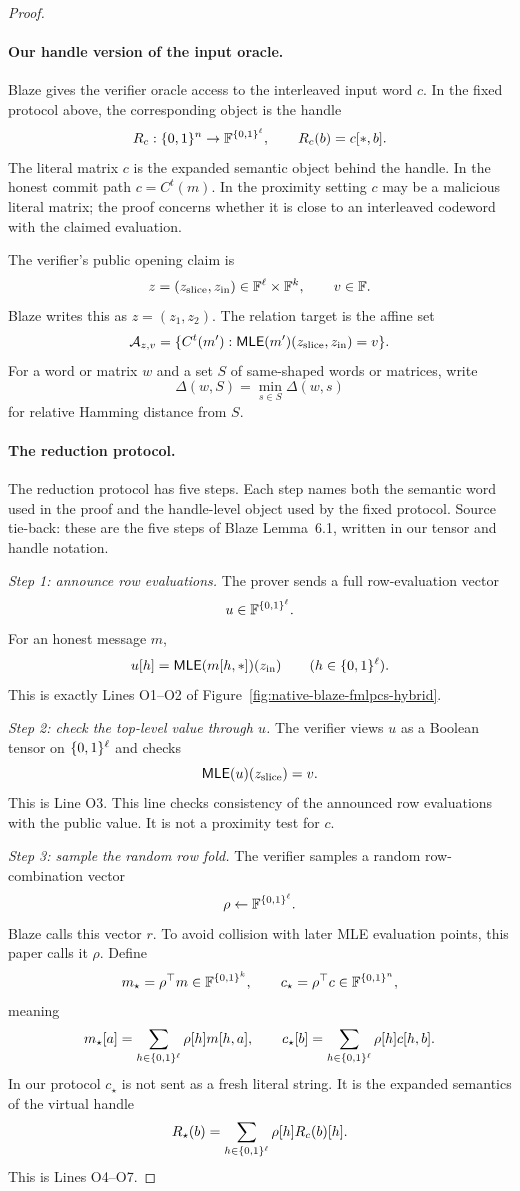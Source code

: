 \begin{proof}
\paragraph{Our handle version of the input oracle.}
Blaze gives the verifier oracle access to the interleaved input word \(c\).  In
the fixed protocol above, the corresponding object is the handle
\[
  R_c:\{0,1\}^n\to\mathbb{F}^{\{0,1\}^\ell},
  \qquad
  R_c(b)=c[\ast,b].
\]
The literal matrix \(c\) is the expanded semantic object behind the handle.  In
the honest commit path \(c=C^t(m)\).  In the proximity setting \(c\) may be a
malicious literal matrix; the proof concerns whether it is close to an
interleaved codeword with the claimed evaluation.

The verifier's public opening claim is
\[
  z=(z_{\mathrm{slice}},z_{\mathrm{in}})
  \in\mathbb{F}^\ell\times\mathbb{F}^k,
  \qquad
  v\in\mathbb{F}.
\]
Blaze writes this as \(z=(z_1,z_2)\).  The relation target is the affine set
\[
  \mathcal A_{z,v}
  =
  \{C^t(m'):\mathsf{MLE}(m')(z_{\mathrm{slice}},z_{\mathrm{in}})=v\}.
\]
For a word or matrix \(w\) and a set \(S\) of same-shaped words or matrices,
write
\[
  \Delta(w,S)=\min_{s\in S}\Delta(w,s)
\]
for relative Hamming distance from \(S\).

\paragraph{The reduction protocol.}
The reduction protocol has five steps.  Each step names both the semantic word
used in the proof and the handle-level object used by the fixed protocol.
Source tie-back: these are the five steps of Blaze Lemma~6.1, written in our
tensor and handle notation.

\emph{Step 1: announce row evaluations.}
The prover sends a full row-evaluation vector
\[
  u\in\mathbb{F}^{\{0,1\}^\ell}.
\]
For an honest message \(m\),
\[
  u[h]=\mathsf{MLE}(m[h,\ast])(z_{\mathrm{in}})
  \qquad(h\in\{0,1\}^\ell).
\]
This is exactly Lines O1--O2 of Figure~\ref{fig:native-blaze-fmlpcs-hybrid}.

\emph{Step 2: check the top-level value through \(u\).}
The verifier views \(u\) as a Boolean tensor on \(\{0,1\}^\ell\) and checks
\[
  \mathsf{MLE}(u)(z_{\mathrm{slice}})
  =
  v.
\]
This is Line O3.  This line checks consistency of the announced row
evaluations with the public value.  It is not a proximity test for \(c\).

\emph{Step 3: sample the random row fold.}
The verifier samples a random row-combination vector
\[
  \rho\leftarrow\mathbb{F}^{\{0,1\}^\ell}.
\]
Blaze calls this vector \(r\).  To avoid collision with later MLE evaluation
points, this paper calls it \(\rho\).  Define
\[
  m_\star=\rho^\top m\in\mathbb{F}^{\{0,1\}^k},
  \qquad
  c_\star=\rho^\top c\in\mathbb{F}^{\{0,1\}^n},
\]
meaning
\[
  m_\star[a]=\sum_{h\in\{0,1\}^\ell}\rho[h]m[h,a],
  \qquad
  c_\star[b]=\sum_{h\in\{0,1\}^\ell}\rho[h]c[h,b].
\]
In our protocol \(c_\star\) is not sent as a fresh literal string.  It is the
expanded semantics of the virtual handle
\[
  R_\star(b)=\sum_{h\in\{0,1\}^\ell}\rho[h]R_c(b)[h].
\]
This is Lines O4--O7.


\end{proof}
